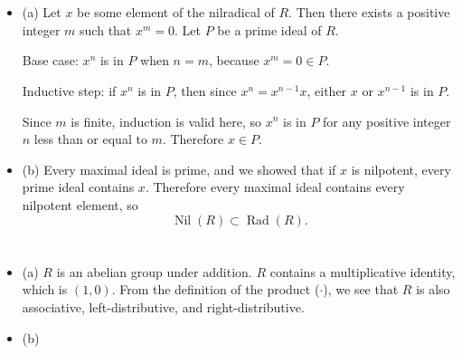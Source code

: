\documentclass[12pt]{article}
\begin{document}
\section{}
\noindent{}\bigskip\par
\begin{itemize}
    \item (a) Let $x$ be some element of the nilradical of $R$. Then there exists a positive integer $m$ such that $x^m=0$. Let $P$ be a prime ideal of $R$.
        \par
        Base case: $x^n$ is in $P$ when $n=m$, because $x^m=0\in P$.
        \par
        Inductive step: if $x^n$ is in $P$, then since $x^n=x^{n-1}x$, either $x$ or $x^{n-1}$ is in $P$.
        \par
        Since $m$ is finite, induction is valid here, so $x^n$ is in $P$ for any positive integer $n$ less than or equal to $m$. Therefore $x \in P$.
    \item (b) Every maximal ideal is prime, and we showed that if $x$ is nilpotent, every prime ideal contains $x$. Therefore every maximal ideal contains every nilpotent element, so
        \[ \operatorname{Nil}(R) \subset \operatorname{Rad}(R). \]
\end{itemize}

\section{}
\noindent{}\bigskip\par
\begin{itemize}
    \item (a) $R$ is an abelian group under addition. $R$ contains a multiplicative identity, which is $(1,0)$. From the definition of the product ($\cdot$), we see that $R$ is also associative, left-distributive, and right-distributive.
    \item (b)
\end{itemize}
\end{document}
